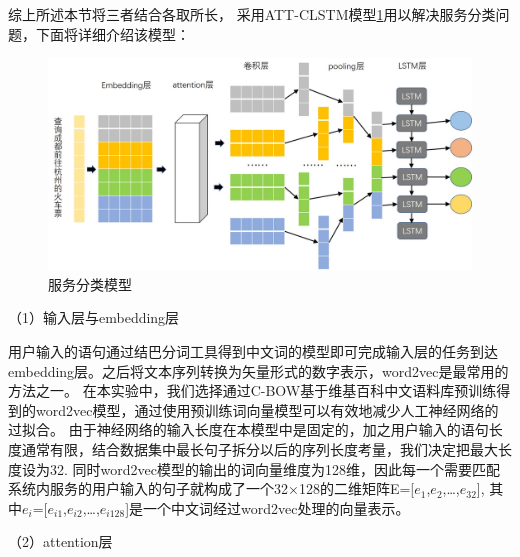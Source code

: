 综上所述本节将三者结合各取所长， 采用ATT-CLSTM模型\ref{fig:cnn-lstm}用以解决服务分类问题，下面将详细介绍该模型：

\begin{figure}[htbp]
    \centering
    \includegraphics[scale=0.5]{./images/cnn-lstm.jpg}
    \caption{服务分类模型}
    \label{fig:cnn-lstm}
  \end{figure}
  （1）输入层与embedding层

  用户输入的语句通过结巴分词工具得到中文词的模型即可完成输入层的任务到达embedding层。之后将文本序列转换为矢量形式的数字表示，word2vec是最常用的方法之一。
  在本实验中，我们选择通过C-BOW基于维基百科中文语料库预训练得到的word2vec模型，通过使用预训练词向量模型可以有效地减少人工神经网络的过拟合。
  由于神经网络的输入长度在本模型中是固定的，加之用户输入的语句长度通常有限，结合数据集中最长句子拆分以后的序列长度考量，我们决定把最大长度设为32.
  同时word2vec模型的输出的词向量维度为128维，因此每一个需要匹配系统内服务的用户输入的句子就构成了一个32×128的二维矩阵E=[$e_{1}$,$e_{2}$,\dots,$e_{32}$],
  其中$e_{i}$=[$e_{i1}$,$e_{i2}$,\dots,$e_{i128}$]是一个中文词经过word2vec处理的向量表示。

  （2）attention层


